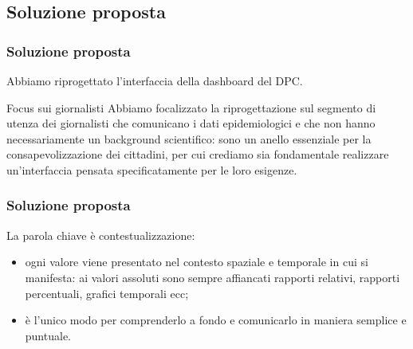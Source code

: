 \documentclass[../../main.tex]{subfiles}
\begin{document}
\subsection{Soluzione proposta}

\begin{frame}
    \frametitle{Soluzione proposta}
    Abbiamo riprogettato l'interfaccia della dashboard del DPC.

    \vspace{-40pt}
    \begin{block}{Focus sui giornalisti}
        Abbiamo focalizzato la riprogettazione sul segmento di utenza dei giornalisti che comunicano i dati epidemiologici e che non hanno necessariamente un background scientifico: sono un anello essenziale per la consapevolizzazione dei cittadini, per cui crediamo sia fondamentale realizzare un'interfaccia pensata specificatamente per le loro esigenze.
    \end{block}

\end{frame}

\begin{frame}
    \frametitle{Soluzione proposta}
    
    La parola chiave è \alert{contestualizzazione}:
    \begin{itemize}
        \item ogni valore viene presentato nel contesto spaziale e temporale in cui si manifesta: ai valori assoluti sono sempre affiancati rapporti relativi, rapporti percentuali, grafici temporali ecc;
        \item è l'unico modo per comprenderlo a fondo e comunicarlo in maniera semplice e puntuale.
    \end{itemize}
    

\end{frame}
\end{document}
